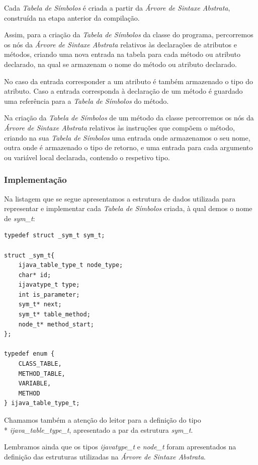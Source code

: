 \documentclass[11pt,a4paper]{article}
\begin{document}
	Cada \emph{Tabela de Símbolos} é criada a partir da \emph{Árvore de Sintaxe Abstrata}, construída na etapa anterior da compilação.
	
	Assim, para a criação da \emph{Tabela de Símbolos} da classe do programa, percorremos os nós da \emph{Árvore de Sintaxe Abstrata} relativos às declarações de atributos e métodos, criando uma nova entrada na tabela para cada método ou atributo declarado, na qual se armazenam o nome do método ou atributo declarado.
	
	No caso da entrada corresponder a um atributo é também armazenado o tipo do atributo. Caso a entrada corresponda à declaração de um método é guardado uma referência para a \emph{Tabela de Símbolos} do método.
	
	Na criação da \emph{Tabela de Símbolos} de um método da classe percorremos os nós da \emph{Árvore de Sintaxe Abstrata} relativos às instruções que compõem o método, criando na sua \emph{Tabela de Símbolos} uma entrada onde armazenamos o seu nome, outra onde é armazenado o tipo de retorno, e uma entrada para cada argumento ou variável local declarada, contendo o respetivo tipo.
	
	\subsubsection{Implementação}
	
	Na listagem que se segue apresentamos a estrutura de dados utilizada para representar e implementar cada \emph{Tabela de Símbolos} criada, à qual demos o nome de \emph{sym\_t}:
	
	\begin{lstlisting}
typedef struct _sym_t sym_t;	

struct _sym_t{
	ijava_table_type_t node_type;
	char* id;
	ijavatype_t type;
	int is_parameter;
	sym_t* next;
	sym_t* table_method;
	node_t* method_start;
};

typedef enum {
	CLASS_TABLE,
	METHOD_TABLE,
	VARIABLE,
	METHOD
} ijava_table_type_t;
	\end{lstlisting}
	
	Chamamos também a atenção do leitor para a definição do tipo \\* \emph{ijava\_table\_type\_t}, apresentado a par da estrutura \emph{sym\_t}.
	
	Lembramos ainda que os tipos \emph{ijavatype\_t} e \emph{node\_t} foram apresentados na definição das estruturas utilizadas na \emph{Árvore de Sintaxe Abstrata}.
	
\end{document}
